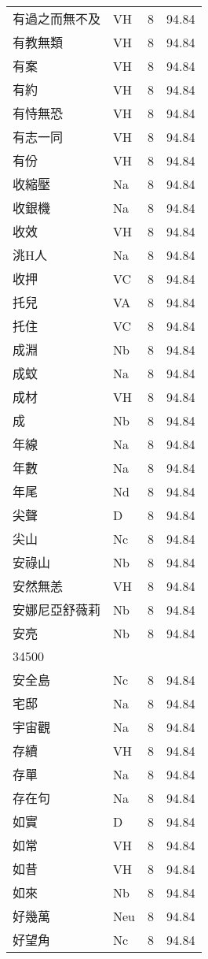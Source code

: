 \documentclass[twocolumn]{book}
\begin{document}
\begin{supertabular}{llrr}
有過之而無不及 & VH & 8 &  94.84\\
有教無類 & VH & 8 &  94.84\\
有案 & VH & 8 &  94.84\\
有約 & VH & 8 &  94.84\\
有恃無恐 & VH & 8 &  94.84\\
有志一同 & VH & 8 &  94.84\\
有份 & VH & 8 &  94.84\\
收縮壓 & Na & 8 &  94.84\\
收銀機 & Na & 8 &  94.84\\
收效 & VH & 8 &  94.84\\
洮H人 & Na & 8 &  94.84\\
收押 & VC & 8 &  94.84\\
托兒 & VA & 8 &  94.84\\
托住 & VC & 8 &  94.84\\
成淵 & Nb & 8 &  94.84\\
成蚊 & Na & 8 &  94.84\\
成材 & VH & 8 &  94.84\\
成 & Nb & 8 &  94.84\\
年線 & Na & 8 &  94.84\\
年數 & Na & 8 &  94.84\\
年尾 & Nd & 8 &  94.84\\
尖聲 & D & 8 &  94.84\\
尖山 & Nc & 8 &  94.84\\
安祿山 & Nb & 8 &  94.84\\
安然無恙 & VH & 8 &  94.84\\
安娜尼亞舒薇莉 & Nb & 8 &  94.84\\
安亮 & Nb & 8 &  94.84\\
34500\\
安全島 & Nc & 8 &  94.84\\
宅邸 & Na & 8 &  94.84\\
宇宙觀 & Na & 8 &  94.84\\
存續 & VH & 8 &  94.84\\
存單 & Na & 8 &  94.84\\
存在句 & Na & 8 &  94.84\\
如實 & D & 8 &  94.84\\
如常 & VH & 8 &  94.84\\
如昔 & VH & 8 &  94.84\\
如來 & Nb & 8 &  94.84\\
好幾萬 & Neu & 8 &  94.84\\
好望角 & Nc & 8 &  94.84\\

\end{supertabular}
\end{document}
